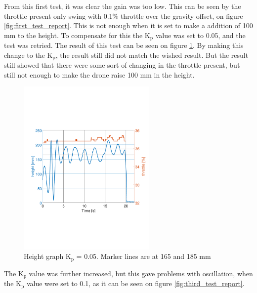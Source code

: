 From this first test, it was clear the gain was too low. This can be seen by the throttle present only swing with 0.1\% throttle over the gravity offset, on figure \ref{fig:first_test_report}. This is not enough when it is set to make a addition of 100 mm to the height. To compensate for this the K$_\text{p}$ value was set to 0.05, and the test was retried. The result of this test can be seen on figure \ref{fig:second_test_report}.
By making this change to the K$_\text{p}$, the result still did not match the wished result. 
But the result still showed that there were some sort of changing in the throttle present, but still not enough to make the drone raise 100 mm in the height. 
\begin{figure}[H]
    \centering
    \includegraphics[width=0.6\textwidth, trim={0 7cm 0 7cm},clip]{figures/Appendix/final_test/kp0,05.pdf}
    \caption{Height graph K$_\text{p}$ = 0.05. Marker lines are at 165 and 185 mm}
    \label{fig:second_test_report}
\end{figure}
The K$_\text{p}$ value was further increased, but this gave problems with oscillation, when the K$_\text{p}$ value were set to 0.1, as it can be seen on figure \ref{fig:third_test_report}.
